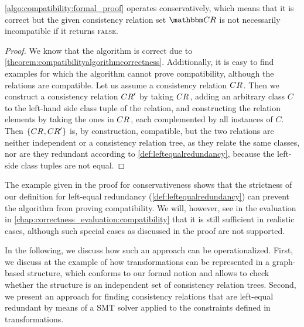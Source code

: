 \begin{theorem}
    \autoref{algo:compatibility:formal_proof} operates conservatively, which means that it is correct but the given consistency relation set $\consistencyrelationset{CR}$ is not necessarily incompatible if it returns \textsc{false}.
\end{theorem}

\begin{proof}
    We know that the algorithm is correct due to \autoref{theorem:compatibilityalgorithmcorrectness}.
    Additionally, it is easy to find examples for which the algorithm cannot prove compatibility, although the relations are compatible.
    Let us assume a consistency relation $\consistencyrelation{CR}{}$. 
    Then we construct a consistency relation $\consistencyrelation{CR}{}'$ by taking $\consistencyrelation{CR}{}$, adding an arbitrary class $C$ to the left-hand side class tuple of the relation, and constructing the relation elements by taking the ones in $\consistencyrelation{CR}{}$, each complemented by all instances of $C$.
    Then $\setted{\consistencyrelation{CR}{},\consistencyrelation{CR}{}'}$ is, by construction, compatible, but the two relations are neither independent or a consistency relation tree, as they relate the same classes, nor are they redundant according to \autoref{def:leftequalredundancy}, because the left-side class tuples are not equal.
\end{proof}

The example given in the proof for conservativeness shows that the strictness of our definition for left-equal redundancy (\autoref{def:leftequalredundancy}) can prevent the algorithm from proving compatibility.
We will, however, see in the evaluation in \autoref{chap:correctness_evaluation:compatibility} that it is still sufficient in realistic cases, although such special cases as discussed in the proof are not supported.

In the following, we discuss how such an approach can be operationalized.
First, we discuss at the example of \qvtr how transformations can be represented in a graph-based structure, which conforms to our formal notion and allows to check whether the structure is an independent set of consistency relation trees.
Second, we present an approach for finding consistency relations that are left-equal redundant by means of a \gls{SMT} solver applied to the constraints defined in \qvtr transformations.


